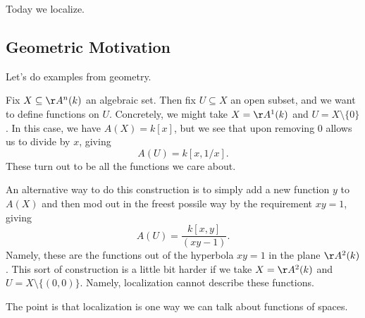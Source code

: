 
Today we localize.

\subsection{Geometric Motivation}
Let's do examples from geometry.

Fix $X\subseteq\AA^n(k)$ an algebraic set. Then fix $U\subseteq X$ an open subset, and we want to define functions on $U$. Concretely, we might take $X=\AA^1(k)$ and $U=X\setminus\{0\}$. In this case, we have $A(X)=k[x]$, but we see that upon removing $0$ allows us to divide by $x$, giving
\[A(U)=k[x,1/x].\]
These turn out to be all the functions we care about.

An alternative way to do this construction is to simply add a new function $y$ to $A(X)$ and then mod out in the freest possile way by the requirement $xy=1$, giving
\[A(U)=\frac{k[x,y]}{(xy-1)}.\]
Namely, these are the functions out of the hyperbola $xy=1$ in the plane $\AA^2(k)$. This sort of construction is a little bit harder if we take $X=\AA^2(k)$ and $U=X\setminus\{(0,0)\}$. Namely, localization cannot describe these functions.

The point is that localization is one way we can talk about functions of spaces.

